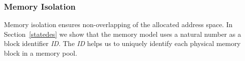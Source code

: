 %


\subsubsection{Memory Isolation}
Memory isolation ensures non-overlapping of the allocated address space. In Section~\ref{statedes} we show that the memory model uses a natural number as a block identifier \emph{ID}. The \emph{ID} helps us to uniquely identify each physical memory block in a memory pool. 


